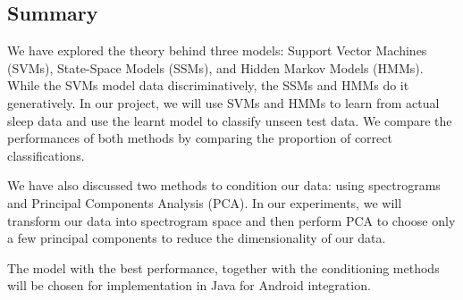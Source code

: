 \subsection{Summary}
	We have explored the theory behind three models: Support Vector Machines (SVMs), State-Space Models (SSMs), and Hidden Markov Models (HMMs). While the SVMs model data discriminatively, the SSMs and HMMs do it generatively. In our project, we will use SVMs and HMMs to learn from actual sleep data and use the learnt model to classify unseen test data. We compare the performances of both methods by comparing the proportion of correct classifications.

	We have also discussed two methods to condition our data: using spectrograms and Principal Components Analysis (PCA). In our experiments, we will transform our data into spectrogram space and then perform PCA to choose only a few principal components to reduce the dimensionality of our data.

	The model with the best performance, together with the conditioning methods will be chosen for implementation in Java for Android integration.